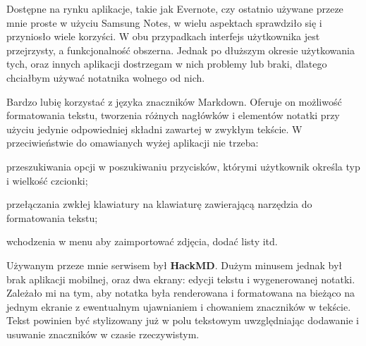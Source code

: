\documentclass[shortabstract]{iithesis}
\begin{document}
Dostępne na rynku aplikacje, takie jak Evernote, czy ostatnio używane przeze mnie proste w użyciu Samsung Notes, w wielu aspektach sprawdziło się i przyniosło wiele korzyści. W obu przypadkach interfejs użytkownika jest przejrzysty, a funkcjonalność obszerna. Jednak po dłuższym okresie użytkowania tych, oraz innych aplikacji dostrzegam w nich problemy lub braki, dlatego chciałbym używać notatnika wolnego od nich.

Bardzo lubię korzystać z języka znaczników Markdown. Oferuje on możliwość formatowania tekstu, tworzenia różnych nagłówków i elementów notatki przy użyciu jedynie odpowiedniej składni zawartej w zwykłym tekście. W przeciwieństwie do omawianych wyżej aplikacji nie trzeba:
\begin{compactitem}
    \item przeszukiwania opcji w poszukiwaniu przycisków, którymi użytkownik określa typ i wielkość czcionki;
    \item przełączania zwkłej klawiatury na klawiaturę zawierającą narzędzia do formatowania tekstu;
    \item wchodzenia w menu aby zaimportować zdjęcia, dodać listy itd.
\end{compactitem} 
Używanym przeze mnie serwisem był \textbf{HackMD}. Dużym minusem jednak był brak aplikacji mobilnej, oraz dwa ekrany: edycji tekstu i wygenerowanej notatki. Zależało mi na tym, aby notatka była renderowana i formatowana na bieżąco na jednym ekranie z ewentualnym ujawnianiem i chowaniem znaczników w tekście. Tekst powinien być stylizowany już w polu tekstowym uwzględniając dodawanie i usuwanie znaczników w czasie rzeczywistym.
\end{document}
